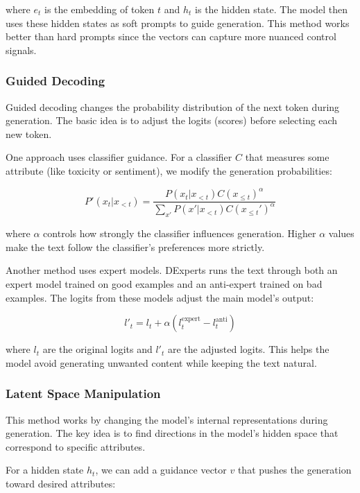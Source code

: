 where $e_t$ is the embedding of token $t$ and $h_t$ is the hidden state. The model then uses these hidden states as soft prompts to guide generation. This method works better than hard prompts since the vectors can capture more nuanced control signals.

\subsubsection{Guided Decoding}

Guided decoding changes the probability distribution of the next token during generation. The basic idea is to adjust the logits (scores) before selecting each new token.

One approach uses classifier guidance. For a classifier $C$ that measures some attribute (like toxicity or sentiment), we modify the generation probabilities:

\begin{equation}
    P'(x_t|x_{<t}) = \frac{P(x_t|x_{<t})C(x_{\leq t})^\alpha}{\sum_{x'} P(x'|x_{<t})C(x_{\leq t}')^\alpha}
\end{equation}

where $\alpha$ controls how strongly the classifier influences generation. Higher $\alpha$ values make the text follow the classifier's preferences more strictly.

Another method uses expert models. DExperts runs the text through both an expert model trained on good examples and an anti-expert trained on bad examples. The logits from these models adjust the main model's output:

\begin{equation}
    l'_t = l_t + \alpha(l^{\text{expert}}_t - l^{\text{anti}}_t)
\end{equation}

where $l_t$ are the original logits and $l'_t$ are the adjusted logits. This helps the model avoid generating unwanted content while keeping the text natural.

\subsubsection{Latent Space Manipulation}

This method works by changing the model's internal representations during generation. The key idea is to find directions in the model's hidden space that correspond to specific attributes.

For a hidden state $h_t$, we can add a guidance vector $v$ that pushes the generation toward desired attributes:


